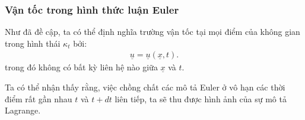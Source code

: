 \documentclass[../../../main.tex]{subfiles}
\begin{document}
\subsubsection{Vận tốc trong hình thức luận Euler}
	Như đã đề cập, ta có thể định nghĩa trường vận tốc tại mọi điểm của không gian trong hình thái $\kappa_t$ bởi:
		\begin{align}
			\underline{u}=\underline{u}(\underline{x},t).
		\end{align}
trong đó không có bất kỳ liên hệ nào giữa $\underline{x}$ và $t$.

	Ta có thể nhận thấy rằng, việc chồng chất các mô tả Euler ở vô hạn các thời điểm rất gần nhau $t$ và $t+dt$ liên tiếp, ta sẽ thu được hình ảnh của sự mô tả Lagrange.
\end{document}
